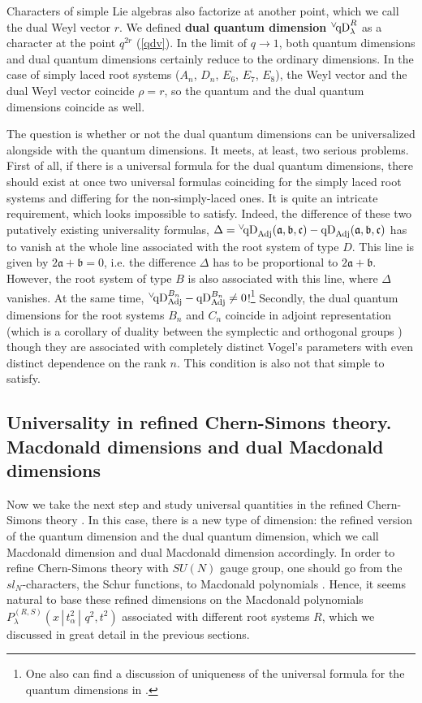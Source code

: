 \documentclass{article}
\def\qDv{{^\vee\!\hbox{qD}}}
\def\qD{\hbox{qD}}
\def\qDv{{^\vee\!\hbox{qD}}}
\def\qD{\hbox{qD}}
\begin{document}
\bigskip

Characters of simple Lie algebras also factorize at another point, which we call the dual Weyl vector $r$. We defined {\bf dual quantum dimension} $\qDv_{\lambda}^{R}$ as a character at the point $q^{2r}$ (\ref{qdv}).
In the limit of $q\to 1$, both quantum dimensions and dual quantum dimensions certainly reduce to the ordinary dimensions. In the case of simply laced root systems ($A_n$, $D_n$, $E_6$, $E_7$, $E_8$), the Weyl vector and the dual Weyl vector coincide $\rho = r$, so the quantum and the dual quantum dimensions coincide as well.

The question is whether or not  the dual quantum dimensions can be universalized alongside with the quantum dimensions. It meets, at least, two serious problems. First of all, if there is a universal formula for the dual quantum dimensions, there should exist at once two universal formulas coinciding for the simply laced root systems and differing for the non-simply-laced ones. It is quite an intricate requirement, which looks impossible to satisfy. Indeed, the difference of these two putatively existing universality formulas, $\Delta=\qDv_{\text{Adj}}(\mathfrak{a},\mathfrak{b},\mathfrak{c})-\qD_{\text{Adj}}(\mathfrak{a},\mathfrak{b},\mathfrak{c})$ has to vanish at the whole line associated with the root system of type $D$. This line is given by $2\mathfrak{a}+\mathfrak{b}=0$, i.e. the difference $\Delta$ has to be proportional to $2\mathfrak{a}+\mathfrak{b}$. However, the root system of type $B$ is also associated with this line, where $\Delta$ vanishes. At the same time, $\qDv_{\text{Adj}}^{B_n}-\qD_{\text{Adj}}^{B_n}\ne 0$!\footnote{One also can find a discussion of uniqueness of the universal formula for the quantum dimensions in \cite{AM21}.} Secondly, the dual quantum dimensions for the root systems $B_n$ and $C_n$ coincide in adjoint representation (which is a corollary of duality between the symplectic and orthogonal groups \cite{dual1,dual2,dual3,dual4}) though they are associated with completely distinct Vogel's parameters with even distinct dependence on the rank $n$. This condition is also not that simple to satisfy.


\subsection{Universality in refined Chern-Simons theory. Macdonald dimensions and dual Macdonald dimensions \label{UniRefCS}}

Now we take the next step and study universal quantities \cite{KS} in the refined Chern-Simons theory \cite{AgSh1,AgSh2,AM1,R,AvMkrtString,Mane,AM2,AM3}. In this case, there is a new type of dimension: the refined version of the quantum dimension and the dual quantum dimension, which we call Macdonald dimension and dual Macdonald dimension accordingly. In order to refine Chern-Simons theory with $SU(N)$ gauge group, one should go from the $sl_N$-characters, the Schur functions, to Macdonald polynomials  \cite{AgSh1, AgSh2}. Hence, it seems natural to base these refined dimensions on the Macdonald polynomials $P^{(R,S)}_{\lambda}(x\,|\,t_{\alpha}^2\,|\,\,q^2,t^2)$ associated with different root systems $R$, which we discussed in great detail in the previous sections.
\end{document}
